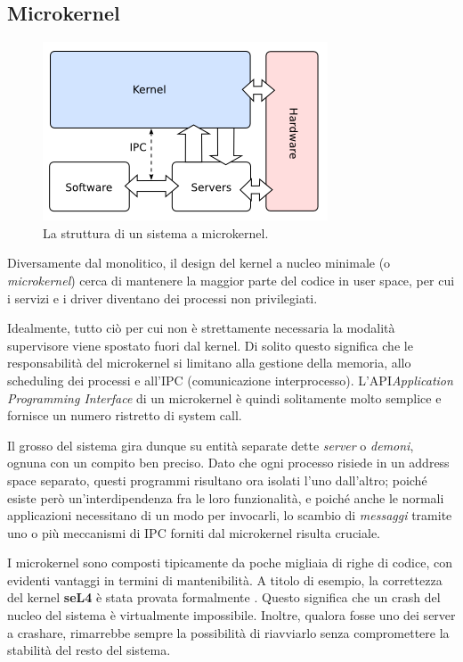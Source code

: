 \documentclass[12pt,a4paper]{report}
\begin{document}
		\subsection{Microkernel}
			\begin{figure}[htbp]
			\centering
			\includegraphics[scale=0.7]{img/microkernel.png}
			\caption{La struttura di un sistema a microkernel. \cite{OSDEV_Microkernel}\label{fig:microkernel}}
			\end{figure}
			
			Diversamente dal monolitico, il design del kernel a nucleo minimale (o \emph{microkernel}) cerca di
			mantenere la maggior parte del codice in user space, per cui i servizi e i driver diventano dei processi non privilegiati.
			
			Idealmente, tutto ciò per cui non è strettamente necessaria la modalità supervisore viene spostato fuori dal
			kernel. Di solito questo significa che le responsabilità del microkernel si limitano alla gestione della memoria,
			allo scheduling dei processi e all'IPC (comunicazione interprocesso). L'API\emph{Application Programming Interface}
			di un microkernel è quindi solitamente molto semplice e fornisce un numero ristretto di system call.
			
			Il grosso del sistema gira dunque su entità separate dette \emph{server} o \emph{demoni}, ognuna con un
			compito ben preciso. Dato che ogni processo risiede in un address space separato, questi programmi
			risultano ora isolati l'uno dall'altro; poiché esiste però un'interdipendenza fra le loro funzionalità, e poiché
			anche le normali applicazioni necessitano di un modo per invocarli, lo scambio di \emph{messaggi}
			tramite uno o più meccanismi di IPC forniti dal microkernel risulta cruciale.
			
			I microkernel sono composti tipicamente da poche migliaia di righe di codice, con evidenti vantaggi
			in termini di mantenibilità. A titolo di esempio, la correttezza del kernel \textbf{seL4} è stata provata
			formalmente \cite{Klein}.
			Questo significa che un crash del nucleo del sistema è virtualmente impossibile. Inoltre, qualora
			fosse uno dei server a crashare, rimarrebbe sempre la possibilità di riavviarlo senza compromettere
			la stabilità del resto del sistema.
			
\end{document}
